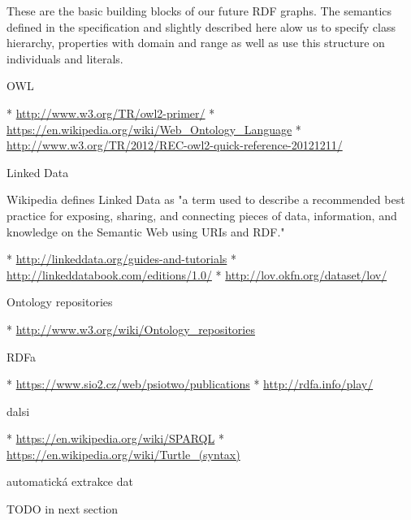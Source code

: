 These are the basic building blocks of our future RDF graphs. The semantics
defined in the specification and slightly described here alow us to specify
class hierarchy, properties with domain and range as well as use this structure
on individuals and literals.  

\sec OWL

\begitems
 * \url{http://www.w3.org/TR/owl2-primer/}
 * \url{https://en.wikipedia.org/wiki/Web_Ontology_Language}
 * \url{http://www.w3.org/TR/2012/REC-owl2-quick-reference-20121211/}
\enditems


\sec Linked Data

Wikipedia defines Linked Data as "a term used to describe a recommended best
practice for exposing, sharing, and connecting pieces of data, information, and
knowledge on the Semantic Web using URIs and RDF."

\begitems
 * \url{http://linkeddata.org/guides-and-tutorials}
 * \url{http://linkeddatabook.com/editions/1.0/}
 * \url{http://lov.okfn.org/dataset/lov/}
\enditems


\sec Ontology repositories

\begitems
 * \url{http://www.w3.org/wiki/Ontology_repositories}
\enditems


\sec RDFa

\begitems
 * \url{https://www.sio2.cz/web/psiotwo/publications}
 * \url{http://rdfa.info/play/}
\enditems


\sec dalsi

\begitems
 * \url{https://en.wikipedia.org/wiki/SPARQL}
 * \url{https://en.wikipedia.org/wiki/Turtle_(syntax)}
\enditems



\sec automatická extrakce dat

TODO in next section

